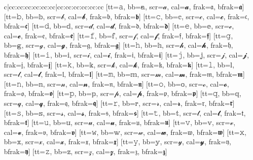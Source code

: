 \documentclass{unittest}
\begin{document}
\begin{tabular}{c|cc:cc:cc:cc:cc:cc|cc:cc:cc:cc:cc:cc}
[tt=𝚊, bb=𝕒, scr=𝒶, cal=𝓪, frak=𝔞, bfrak=𝖆]
[tt=𝚋, bb=𝕓, scr=𝒷, cal=𝓫, frak=𝔟, bfrak=𝖇]
[tt=𝚌, bb=𝕔, scr=𝒸, cal=𝓬, frak=𝔠, bfrak=𝖈]
[tt=𝚍, bb=𝕕, scr=𝒹, cal=𝓭, frak=𝔡, bfrak=𝖉]
[tt=𝚎, bb=𝕖, scr=ℯ, cal=𝓮, frak=𝔢, bfrak=𝖊]
[tt=𝚏, bb=𝕗, scr=𝒻, cal=𝓯, frak=𝔣, bfrak=𝖋]
[tt=𝚐, bb=𝕘, scr=ℊ, cal=𝓰, frak=𝔤, bfrak=𝖌]
[tt=𝚑, bb=𝕙, scr=𝒽, cal=𝓱, frak=𝔥, bfrak=𝖍]
[tt=𝚒, bb=𝕚, scr=𝒾, cal=𝓲, frak=𝔦, bfrak=𝖎]
[tt=𝚓, bb=𝕛, scr=𝒿, cal=𝓳, frak=𝔧, bfrak=𝖏]
[tt=𝚔, bb=𝕜, scr=𝓀, cal=𝓴, frak=𝔨, bfrak=𝖐]
[tt=𝚕, bb=𝕝, scr=𝓁, cal=𝓵, frak=𝔩, bfrak=𝖑]
[tt=𝚖, bb=𝕞, scr=𝓂, cal=𝓶, frak=𝔪, bfrak=𝖒]
[tt=𝚗, bb=𝕟, scr=𝓃, cal=𝓷, frak=𝔫, bfrak=𝖓]
[tt=𝚘, bb=𝕠, scr=ℴ, cal=𝓸, frak=𝔬, bfrak=𝖔]
[tt=𝚙, bb=𝕡, scr=𝓅, cal=𝓹, frak=𝔭, bfrak=𝖕]
[tt=𝚚, bb=𝕢, scr=𝓆, cal=𝓺, frak=𝔮, bfrak=𝖖]
[tt=𝚛, bb=𝕣, scr=𝓇, cal=𝓻, frak=𝔯, bfrak=𝖗]
[tt=𝚜, bb=𝕤, scr=𝓈, cal=𝓼, frak=𝔰, bfrak=𝖘]
[tt=𝚝, bb=𝕥, scr=𝓉, cal=𝓽, frak=𝔱, bfrak=𝖙]
[tt=𝚞, bb=𝕦, scr=𝓊, cal=𝓾, frak=𝔲, bfrak=𝖚]
[tt=𝚟, bb=𝕧, scr=𝓋, cal=𝓿, frak=𝔳, bfrak=𝖛]
[tt=𝚠, bb=𝕨, scr=𝓌, cal=𝔀, frak=𝔴, bfrak=𝖜]
[tt=𝚡, bb=𝕩, scr=𝓍, cal=𝔁, frak=𝔵, bfrak=𝖝]
[tt=𝚢, bb=𝕪, scr=𝓎, cal=𝔂, frak=𝔶, bfrak=𝖞]
[tt=𝚣, bb=𝕫, scr=𝓏, cal=𝔃, frak=𝔷, bfrak=𝖟]
\bottomrule
\end{tabular}
\end{document}
